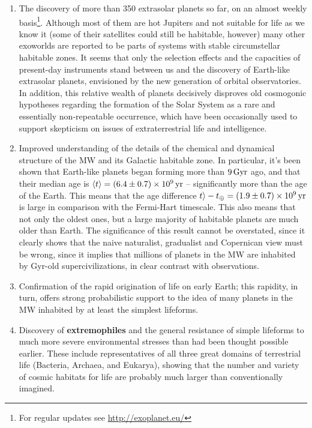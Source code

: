 \documentclass[a4paper,10pt]{article}
\begin{document}
\begin{enumerate}
    \item The discovery of more than 350 extrasolar planets so far, on an almost weekly basis\footnote{For regular updates see \href{http://exoplanet.eu/}{http://exoplanet.eu/}}. Although most of them are hot Jupiters and not suitable for life as we know it (some of their satellites could still be habitable, however) many other exoworlds are reported to be parts of systems with stable circumstellar habitable zones. It seems that only the selection effects and the capacities of present-day instruments stand between us and the discovery of Earth-like extrasolar planets, envisioned by the new generation of orbital observatories. In addition, this relative wealth of planets decisively disproves old cosmogonic hypotheses regarding the formation of the Solar System as a rare and essentially non-repeatable occurrence, which have been occasionally used to support skepticism on issues of extraterrestrial life and intelligence.
    \item Improved understanding of the details of the chemical and dynamical structure of the MW and its Galactic habitable zone. In particular, it's been shown that Earth-like planets began forming more than $9\,{\rm Gyr}$ ago, and that their median age is $\langle t\rangle = (6.4\pm0.7)\times10^9\,{\rm yr}$ -- significantly more than the age of the Earth. This means that the age difference $t\rangle-t_\oplus=(1.9\pm0.7)\times10^9\,{\rm yr}$ is large in comparison with the Fermi-Hart timescale. This also means that not only the oldest ones, but a large majority of habitable planets are much older than Earth. The significance of this result cannot be overstated, since it clearly shows that the naive naturalist, gradualist and Copernican view must be wrong, since it implies that millions of planets in the MW are inhabited by Gyr-old supercivilizations, in clear contrast with observations.
    \item Confirmation of the rapid origination of life on early Earth; this rapidity, in turn, offers strong probabilistic support to the idea of many planets in the MW inhabited by at least the simplest lifeforms.
    \item Discovery of \textbf{extremophiles} and the general resistance of simple lifeforms to much more severe environmental stresses than had been thought possible earlier. These include representatives of all three great domains of terrestrial life (Bacteria, Archaea, and Eukarya), showing that the number and variety of cosmic habitats for life are probably much larger than conventionally imagined.

\end{enumerate}
\end{document}
